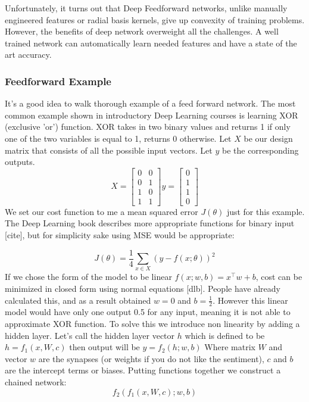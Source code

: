 \documentclass[paper=a4, fontsize=11pt]{scrartcl}
\numberwithin{equation}{section}		%
\numberwithin{figure}{section}			%
\numberwithin{table}{section}			%
\begin{document}
	Unfortunately, it turns out that Deep Feedforward networks, unlike manually engineered features or radial basis kernels, give up convexity of training problems. However, the benefits of deep network overweight all the challenges. A well trained network can automatically learn needed features and have a state of the art accuracy.
	
	
	\subsubsection{Feedforward Example}
	It's a good idea to walk thorough example of a feed forward network. The most common example shown in introductory Deep Learning courses is learning XOR (exclusive 'or') function. XOR takes in two binary values and returns 1 if only one of the two variables is equal to 1, returns 0 otherwise.
	Let $X$ be our design matrix that consists of all the possible input vectors. Let $y$ be the corresponding outputs. 
		$$ X = 
		\begin{bmatrix}
			0 & 0 \\
			0 & 1 \\
			1 & 0 \\
			1 & 1
		\end{bmatrix} 
		y = 
		\begin{bmatrix}
		0 \\
		1 \\
		1 \\
		0 
		\end{bmatrix}$$
	We set our cost function to me a mean squared error $J(\theta)$ just for this example. The Deep Learning book describes more appropriate functions for binary input [cite], but for simplicity sake using MSE would be appropriate:
	
		$$ J(\theta)=\frac{1}{4}\sum_{x\in X}^{}(y-f(x;\theta))^2 $$
	If we chose the form of the model to be linear $ f(x;w,b)=x^\top w + b $, cost can be minimized in closed form using normal equations [dlb]. People have already calculated this, and as a result obtained $ w = 0 $ and $ b = \frac{1}{2}$. However this linear model would have only one output 0.5 for any input, meaning it is not able to approximate XOR function. To solve this we introduce non linearity by adding a hidden layer. Let's call the hidden layer vector $h$ which is defined to be $ h = f_1(x,W,c) $ then output will be $ y = f_2(h;w,b)$ Where matrix $W$ and vector $w$ are the synapses (or weights if you do not like the sentiment), $c$ and $b$ are the intercept terms or biases. Putting functions together we construct a chained network:
		$$ f_2(f_1(x,W,c);w,b) $$
	
\end{document}
